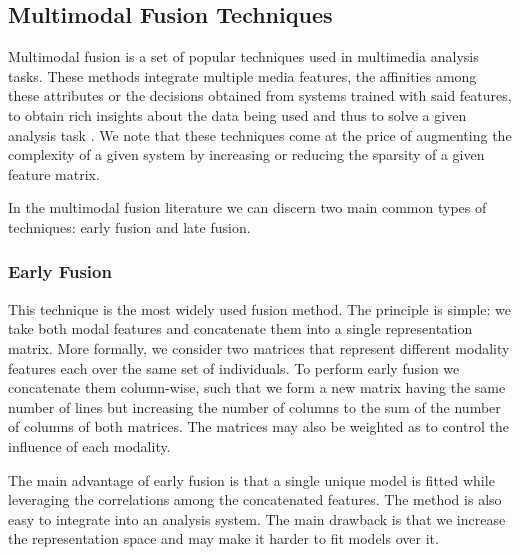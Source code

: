 \documentclass{llncs}
\begin{document}
\subsection{Multimodal Fusion Techniques}
Multimodal fusion is a set of popular techniques used in multimedia analysis tasks. T\textit{}hese methods integrate multiple media features, the affinities among these attributes or the decisions obtained from systems trained with said features, to obtain rich insights about the data being used and thus to solve a given analysis  task \cite{AtreyHEK10}. We note that these techniques come at the price of augmenting the complexity of a given system by increasing or reducing the sparsity of a given feature matrix.


In the multimodal fusion literature we can discern two main common types of techniques: early fusion and late fusion. 
\subsubsection{Early Fusion}
This technique is the most widely used fusion method. The principle is simple: we take both modal features and concatenate them into a single representation matrix. More formally, we consider two matrices  that represent different modality features each  over the same set of individuals. To perform early fusion we concatenate them column-wise, such that we form a new matrix having the same number of lines but increasing the number of columns to the sum of the number of columns of both matrices. The matrices may also be weighted as to control the influence of each modality.

The main advantage of early fusion is that a single unique model is fitted while leveraging the correlations among the concatenated features. The method is also easy to integrate into an analysis system. The main drawback is that we increase the representation space and may make it harder to fit models over it.
%


%
\end{document}

